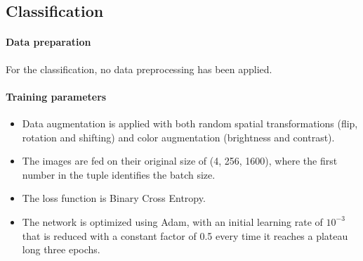 \documentclass[10pt,twocolumn,letterpaper]{article}
\begin{document}
   \subsection{Classification}
      \paragraph{Data preparation} 
         For the classification, no data preprocessing has been applied.
                 
      \paragraph{Training parameters}
      \begin{itemize}
         \item Data augmentation is applied with both random spatial transformations (flip, rotation and shifting) and color augmentation (brightness and contrast).
         \item The images are fed on their original size of (4, 256, 1600), where the first number in the tuple identifies the batch size.
         \item The loss function is Binary Cross Entropy. 
         \item The network is optimized using Adam, with an initial learning rate of $ 10^{-3} $ that is reduced with a constant factor of 0.5 every time it reaches a plateau long three epochs.
      \end{itemize}
\end{document}
